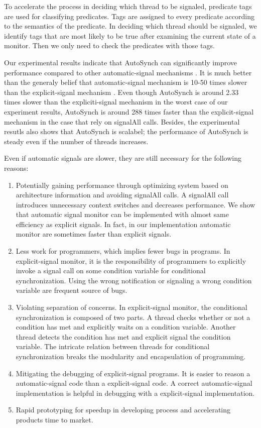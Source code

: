 \documentclass[preprint]{sigplanconf}
\begin{document}
To accelerate the process in deciding which thread to be signaled, predicate 
tags are used for classifying predicates. Tags are assigned to every predicate
according to the semantics of the predicate. In deciding which thread should be 
signaled, we identify tags that are most likely to be true after examining the 
current state of a monitor. Then we only need to check the predicates with 
those tags. 

Our experimental results indicate that AutoSynch can significantly improve
performance compared to other automatic-signal mechanisms \cite{bh05}. It is 
much better than the generaly belief that automatic-signal mechanism is 10-50
times slower than the explicit-siganl mechanism \cite{bfc95}. 
Even though AutoSynch is around 2.33 times slower than the expliciti-signal 
mechanism in the worst case of our experiment results, AutoSynch is around 288 
times faster than the explicit-signal mechanism in the case that rely on 
signalAll calls. Besides, the experimental resutls also shows that AutoSynch is 
scalabel; the performance of AutoSynch is steady even if the number of 
threads increases. 


Even if automatic signals are slower, they are still necessary for the following
reasons: 
\begin{enumerate}
    \item Potentially gaining performance through optimizing system based on
        architecture information and avoiding signalAll calls. A signalAll 
        call introduces unnecessary context switches and decreases performance. 
        We show that
        automatic signal monitor can be implemented with almost same efficiency
        as explicit signals. In fact, in our implementation automatic monitor
        are sometimes faster than explicit signals. 
    \item Less work for programmers, which implies fewer bugs in programs.
        In explicit-signal monitor, it is the responsibility of programmers to 
        explicitly invoke a signal call on some condition variable for
        conditional synchronization. Using the wrong notification or signaling
        a wrong condition variable are frequent source of bugs. 
    \item Violating separation of concerns. In explicit-signal monitor, the
        conditional synchronization is composed of two parts. A thread checks
        whether or not a condition has met and explicitly waits on a
        condition variable. Another thread detects the condition has met and
        explicit signal the condition variable. The intricate relation between
        threads for conditional synchronization breaks the modularity and 
        encapsulation of programming.  
    \item Mitigating the debugging of explicit-signal programs. It is easier to
        reason a automatic-signal code than a explicit-signal code. A correct
        automatic-signal implementation is helpful in debugging with a 
        explicit-signal implementation.  
    \item Rapid prototyping for speedup in developing process and accelerating
        products time to market.
\end{enumerate}
\end{document}

